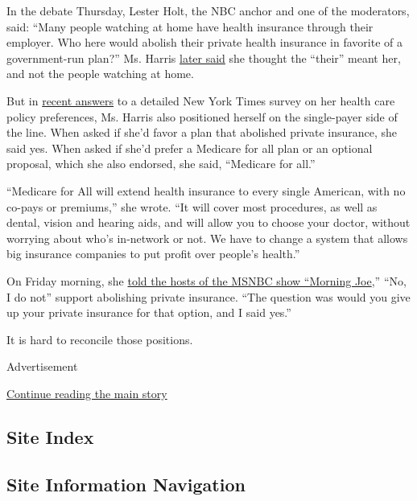 In the debate Thursday, Lester Holt, the NBC anchor and one of the
moderators, said: ``Many people watching at home have health insurance
through their employer. Who here would abolish their private health
insurance in favorite of a government-run plan?'' Ms. Harris
\href{https://www.cbsnews.com/news/harris-clarifies-debate-answer-on-eliminating-private-insurance/}{later
said} she thought the ``their'' meant her, and not the people watching
at home.

But in
\href{https://www.nytimes3xbfgragh.onion/2019/06/23/us/politics/2020-democrats-health-care.html?module=inline}{recent
answers} to a detailed New York Times survey on her health care policy
preferences, Ms. Harris also positioned herself on the single-payer side
of the line. When asked if she'd favor a plan that abolished private
insurance, she said yes. When asked if she'd prefer a Medicare for all
plan or an optional proposal, which she also endorsed, she said,
``Medicare for all.''

``Medicare for All will extend health insurance to every single
American, with no co-pays or premiums,'' she wrote. ``It will cover most
procedures, as well as dental, vision and hearing aids, and will allow
you to choose your doctor, without worrying about who's in-network or
not. We have to change a system that allows big insurance companies to
put profit over people's health.''

On Friday morning, she
\href{https://twitter.com/MSNBC/status/1144586331424731137?ref_src=twsrc\%5Etfw\%7Ctwcamp\%5Etweetembed\%7Ctwterm\%5E1144586331424731137\&ref_url=https\%3A\%2F\%2Fthehill.com\%2Fhomenews\%2Fcampaign\%2F450839-harris-clarifies-private-insurance-stance-no-no-i-dont-think-it-should-be}{told
the hosts of the MSNBC show ``Morning Joe},'' ``No, I do not'' support
abolishing private insurance. ``The question was would you give up your
private insurance for that option, and I said yes.''

It is hard to reconcile those positions.

Advertisement

\protect\hyperlink{after-bottom}{Continue reading the main story}

\hypertarget{site-index}{%
\subsection{Site Index}\label{site-index}}

\hypertarget{site-information-navigation}{%
\subsection{Site Information
Navigation}\label{site-information-navigation}}

